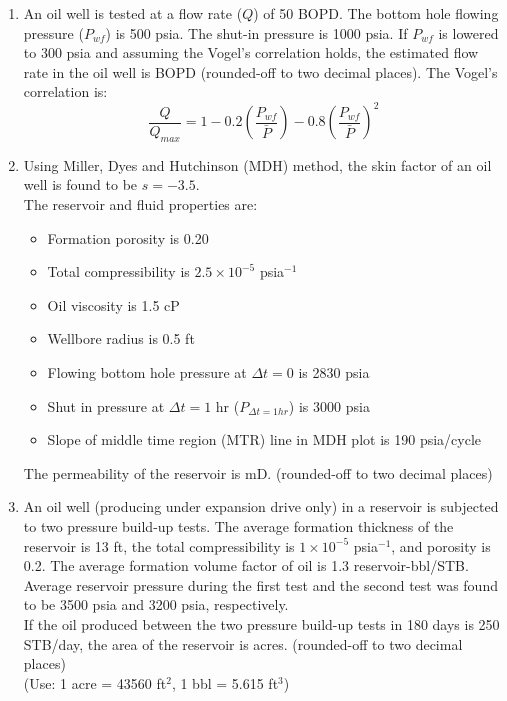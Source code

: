 \documentclass[12pt,a4paper]{article}
\begin{document}
\begin{enumerate}
\item An oil well is tested at a flow rate ($Q$) of 50 BOPD. The bottom hole flowing pressure ($P_{wf}$) is 500 psia. The shut-in pressure is 1000 psia. If $P_{wf}$ is lowered to 300 psia and assuming the Vogel's correlation holds, the estimated flow rate in the oil well is \underline{\hspace{2cm}} BOPD (rounded-off to two decimal places). The Vogel's correlation is:
\[ \frac{Q}{Q_{max}} = 1 - 0.2\left(\frac{P_{wf}}{\bar{P}}\right) - 0.8\left(\frac{P_{wf}}{\bar{P}}\right)^2 \] \hfill{}
\pagebreak

\item Using Miller, Dyes and Hutchinson (MDH) method, the skin factor of an oil well is found to be $s = -3.5$. \\ 

The reservoir and fluid properties are: 
\begin{itemize}
  \item Formation porosity is 0.20
  \item Total compressibility is $2.5 \times 10^{-5}$ psia$^{-1}$
  \item Oil viscosity is 1.5 cP
  \item Wellbore radius is 0.5 ft
  \item Flowing bottom hole pressure at $\Delta t = 0$ is 2830 psia
  \item Shut in pressure at $\Delta t = 1$ hr ($P_{\Delta t=1hr}$) is 3000 psia
  \item Slope of middle time region (MTR) line in MDH plot is 190 psia/cycle
\end{itemize}

The permeability of the reservoir is \underline{\hspace{2cm}} mD. (rounded-off to two decimal places) \hfill{}

\item An oil well (producing under expansion drive only) in a reservoir is subjected to two pressure build-up tests. The average formation thickness of the reservoir is 13 ft, the total compressibility is $1\times10^{-5}$ psia$^{-1}$, and porosity is 0.2. The average formation volume factor of oil is 1.3 reservoir-bbl/STB. Average reservoir pressure during the first test and the second test was found to be 3500 psia and 3200 psia, respectively. \\ 
If the oil produced between the two pressure build-up tests in 180 days is 250 STB/day, the area of the reservoir is \underline{\hspace{2cm}} acres. (rounded-off to two decimal places) \\ 
(Use: 1 acre = 43560 ft$^2$, 1 bbl = 5.615 ft$^3$) \hfill{}


\end{enumerate}
\end{document}
